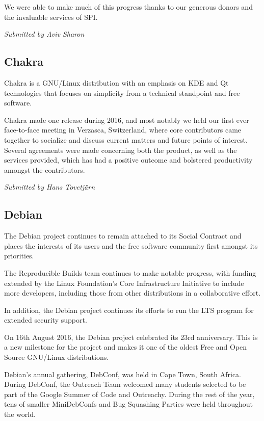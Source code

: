 \documentclass[letterpaper]{report}
\begin{document}
We were able to make much of this progress thanks to our generous donors
and the invaluable services of SPI.

{\em Submitted by Aviv Sharon}

\subsection{Chakra}

Chakra is a GNU/Linux distribution with an emphasis on KDE and Qt
technologies that focuses on simplicity from a technical standpoint and
free software.

Chakra made one release during 2016, and most notably we held our first
ever face-to-face meeting in Verzasca, Switzerland, where core
contributors came together to socialize and discuss current matters and
future points of interest. Several agreements were made concerning both
the product, as well as the services provided, which has had a positive
outcome and bolstered productivity amongst the contributors.

{\em Submitted by Hans Tovetjärn}

\subsection{Debian}

The Debian project continues to remain attached to its Social Contract
and places the interests of its users and the free software community
first amongst its priorities.

The Reproducible Builds team continues to make notable progress, with
funding extended by the Linux Foundation's Core Infrastructure
Initiative to include more developers, including those from other
distributions in a collaborative effort.

In addition, the Debian project continues its efforts to run the LTS
program for extended security support.

On 16th August 2016, the Debian project celebrated its 23rd anniversary.
This is a new milestone for the project and makes it one of the oldest
Free and Open Source GNU/Linux distributions.

Debian's annual gathering, DebConf, was held in Cape Town, South Africa.
During DebConf, the Outreach Team welcomed many students selected to be
part of the Google Summer of Code and Outreachy. During the rest of the
year, tens of smaller MiniDebConfs and Bug Squashing Parties were held
throughout the world.
\end{document}
